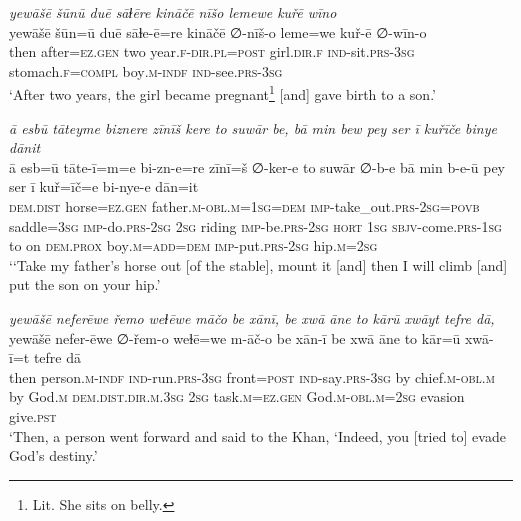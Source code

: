 \ea \label{KŠ.92}
\textit{yewāšē šūnū duē sāɫēre kināčē nīšo lemewe kuřē wīno} \\ 
\gll yewāšē šūn=ū duē sāɫe-ē=re kināčē ∅-nīš-o leme=we kuř-ē ∅-wīn-o \\ 
 then after\textsc{\textsc{=ez.gen}} two year\textsc{.f}\textsc{-dir}\textsc{.pl}\textsc{=\textsc{post}} girl\textsc{.dir}\textsc{.f} \textsc{ind-}sit\textsc{.prs}\textsc{-3sg} stomach\textsc{.f}\textsc{=compl} boy\textsc{.m}\textsc{-indf} \textsc{ind-}see\textsc{.prs}\textsc{-3sg} \\ 
\glt `After two years, the girl became pregnant\footnote{Lit. She sits on belly.} [and] gave birth to a son.'
\z 
 
\ea \label{KŠ.96}
\textit{ā esbū tāteyme biznere zīnīš kere to suwār be, bā min bew pey ser ī kuřīče binye dānit} \\ 
\gll ā esb=ū tāte-ī=m=e bi-zn-e=re zīnī=š ∅-ker-e to suwār ∅-b-e bā min b-e-ū pey ser ī kuř=īč=e bi-nye-e dān=it \\ 
 \textsc{dem.dist} horse\textsc{\textsc{=ez.gen}} father\textsc{.m}\textsc{-obl}\textsc{.m}\textsc{=\textsc{1sg}}\textsc{=dem} \textsc{imp-}take\_out\textsc{.prs}-\textsc{2sg}\textsc{=\textsc{povb}} saddle\textsc{=3sg} \textsc{imp-}do\textsc{.prs}-\textsc{2sg} \textsc{2sg} riding \textsc{imp-}be\textsc{.prs}-\textsc{2sg} \textsc{hort} \textsc{1sg} \textsc{sbjv-}come\textsc{.prs}\textsc{-\textsc{1sg}} to on \textsc{dem.prox} boy\textsc{.m}\textsc{=add}\textsc{=dem} \textsc{imp-}put\textsc{.prs}-\textsc{2sg} hip\textsc{.m}\textsc{=\textsc{2sg}} \\ 
\glt `‘Take my father’s horse out [of the stable], mount it [and] then I will climb [and] put the son on your hip.'
\z 
 
\ea \label{KŠ.97}
\textit{yewāšē neferēwe řemo weɫēwe māčo be xānī, be xwā āne to kārū xwāyt tefre dā,} \\ 
\gll yewāšē nefer-ēwe ∅-řem-o weɫē=we m-āč-o be xān-ī be xwā āne to kār=ū xwā-ī=t tefre dā \\ 
 then person\textsc{.m}\textsc{-indf} \textsc{ind-}run\textsc{.prs}\textsc{-3sg} front\textsc{=\textsc{post}} \textsc{ind-}say\textsc{.prs}\textsc{-3sg} by chief\textsc{.m}\textsc{-obl}\textsc{.m} by God\textsc{.m} \textsc{dem.dist}\textsc{.dir}\textsc{.m}\textsc{.3sg} \textsc{2sg} task\textsc{.m}\textsc{\textsc{=ez.gen}} God\textsc{.m}\textsc{-obl}\textsc{.m}\textsc{=\textsc{2sg}} evasion give\textsc{.pst} \\ 
\glt `Then, a person went forward and said to the Khan, ‘Indeed, you [tried to] evade God’s destiny.'
\z 
 
